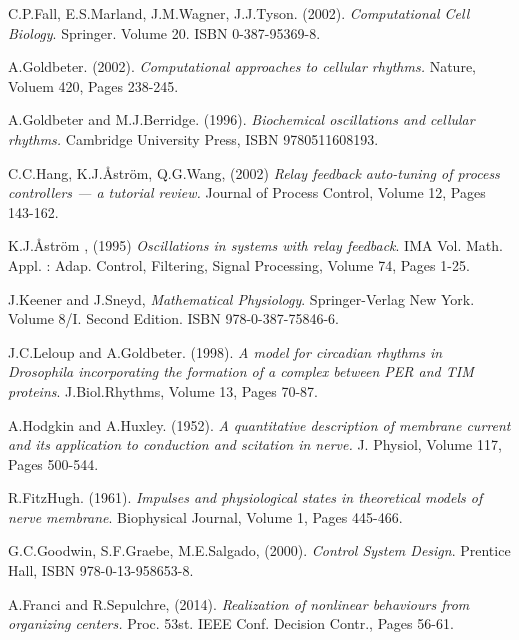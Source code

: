 \documentclass[a4paper, 12pt]{article}
\begin{document}
\begin{thebibliography}{9}


C.P.Fall, E.S.Marland, J.M.Wagner, J.J.Tyson. (2002). \emph{Computational Cell Biology}. Springer. Volume 20. ISBN 0-387-95369-8. 

A.Goldbeter. (2002). \emph{Computational approaches to cellular rhythms.} Nature, Voluem 420, Pages 238-245.

A.Goldbeter and M.J.Berridge. (1996). \emph{Biochemical oscillations and cellular rhythms.} Cambridge University Press, ISBN 9780511608193. 

C.C.Hang, K.J.\r{A}str\"{o}m, Q.G.Wang, (2002) \emph{Relay feedback auto-tuning of process controllers --- a tutorial review.} Journal of Process Control, Volume 12, Pages 143-162. 

K.J.\r{A}str\"{o}m , (1995) \emph{Oscillations in systems with relay feedback}. IMA Vol. Math. Appl. : Adap. Control, Filtering, Signal Processing, Volume 74, Pages 1-25. 

J.Keener and J.Sneyd, \emph{Mathematical Physiology}. Springer-Verlag New York. Volume 8/I. Second Edition. ISBN 978-0-387-75846-6. 

J.C.Leloup and A.Goldbeter. (1998). \emph{A model for circadian rhythms in Drosophila incorporating the formation of a complex between PER and TIM proteins}. J.Biol.Rhythms, Volume 13, Pages 70-87. 

A.Hodgkin and A.Huxley. (1952). \emph{A quantitative description of membrane current and its application to conduction and scitation in nerve.} J. Physiol, Volume 117, Pages 500-544.

R.FitzHugh. (1961). \emph{Impulses and physiological states in theoretical models of nerve membrane}. Biophysical Journal, Volume 1, Pages 445-466.

G.C.Goodwin, S.F.Graebe, M.E.Salgado, (2000). \emph{Control System Design}. Prentice Hall, ISBN 978-0-13-958653-8.

A.Franci and R.Sepulchre, (2014). \emph{Realization of nonlinear behaviours from organizing centers.} Proc. 53st. IEEE Conf. Decision Contr., Pages 56-61.


\end{thebibliography}
\end{document}
